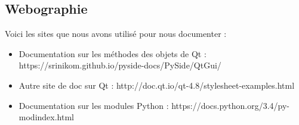\documentclass[a4paper,12pt]{article}
\begin{document}
\subsection{Webographie}
	
	Voici les sites que nous avons utilisé pour nous documenter :
	
	\begin{itemize}
		\item Documentation sur les méthodes des objets de Qt : https://srinikom.github.io/pyside-docs/PySide/QtGui/
		\item Autre site de doc sur Qt : http://doc.qt.io/qt-4.8/stylesheet-examples.html
		\item Documentation sur les modules Python : https://docs.python.org/3.4/py-modindex.html
	\end{itemize}
\end{document}
